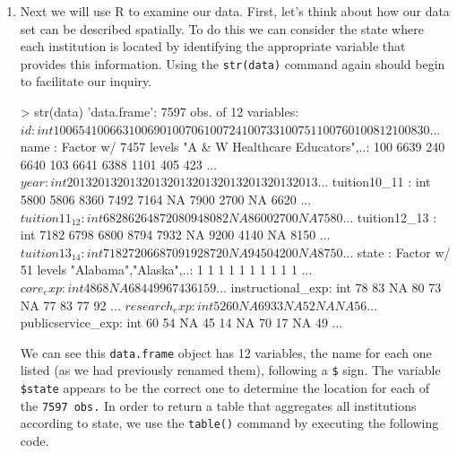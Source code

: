 \documentclass{article}
\newenvironment{Schunk}{}{}
\newcommand{\code}[1]{\texttt{#1}}
\newcommand{\proglang}[1]{\textsf{#1}}
\begin{document}
{\begin{enumerate}[leftmargin=15mm]
\begin{Schunk}
\begin{Sinput}

names(data) <- data_names

\end{Sinput}
\end{Schunk}

Now we can type \code{str(data)} to verify that our variables have been renamed.

\item Next we will use \proglang{R} to examine our data.  First, let's think about how our data set can be described spatially.  To do this we can consider the state where each institution is located by identifying the appropriate variable that provides this information.  Using the \code{str(data)} command again should begin to facilitate our inquiry.

\begin{Schunk}
\begin{Sinput}

> str(data)
'data.frame':	7597 obs. of  12 variables:
 $ id               : int  100654 100663 100690 100706 100724 100733 100751 100760 100812 100830 ...
 $ name             : Factor w/ 7457 levels "A & W Healthcare Educators",..: 100 6639 240 6640 103 6641 6388 1101 405 423 ...
 $ year             : int  2013 2013 2013 2013 2013 2013 2013 2013 2013 2013 ...
 $ tuition10_11     : int  5800 5806 8360 7492 7164 NA 7900 2700 NA 6620 ...
 $ tuition11_12     : int  6828 6264 8720 8094 8082 NA 8600 2700 NA 7580 ...
 $ tuition12_13     : int  7182 6798 6800 8794 7932 NA 9200 4140 NA 8150 ...
 $ tuition13_14     : int  7182 7206 6870 9192 8720 NA 9450 4200 NA 8750 ...
 $ state            : Factor w/ 51 levels "Alabama","Alaska",..: 1 1 1 1 1 1 1 1 1 1 ...
 $ core_exp         : int  48 68 NA 68 44 99 67 43 61 59 ...
 $ instructional_exp: int  78 83 NA 80 73 NA 77 83 77 92 ...
 $ research_exp     : int  52 60 NA 69 33 NA 52 NA NA 56 ...
 $ publicservice_exp: int  60 54 NA 45 14 NA 70 17 NA 49 ...
 
\end{Sinput}
\end{Schunk}

We can see this \code{data.frame} object has 12 variables, the name for each one listed (as we had previously renamed them), following a \code{\$} sign.  The variable \code{\$state} appears to be the correct one to determine the location for each of the \code{7597 obs.}  In order to return a table that aggregates all institutions according to state, we use the \code{table()} command by executing the following code.


\end{enumerate}}
\end{document}
